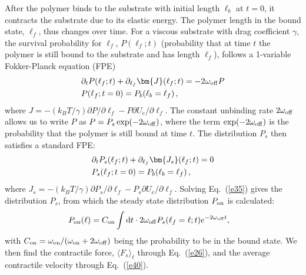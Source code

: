 \documentclass[twocolumn,prl,english]{revtex4-1}
\newcommand*\diff{\mathop{}\!\mathrm{d}}
\begin{document}
After the polymer binds to the substrate with initial length $\ell_b$ at $t=0$, it contracts the substrate due to its elastic energy.  The polymer length in the bound state, $\ell_f$, thus changes over time. For a viscous substrate with drag coefficient $\gamma$, the survival probability for $\ell_f$, $P(\ell_f;t)$ (probability that at time $t$ the polymer is still bound to the substrate and has length $\ell_f$), follows a 1-variable Fokker-Planck equation (FPE)
\begin{align}
&\partial_t {P}( \ell_f;t)+\partial_{\ell_f} {\bm {J}( \ell_f;t)}= - 2\omega_{\rm off}{P}\notag\\
& {P}( \ell_f;t=0)=P_b(\ell_b=\ell_f)\,,\label{e24}
\end{align}
where $J= -(k_B T/\gamma)\partial P/\partial \ell_f-{P}\partial U_e/\partial \ell_f $. The constant unbinding rate $2\omega_{\rm off}$ allows us to write $P$ as $P=P_s \exp(-2\omega_{\rm off})$, where the term $\exp(-2\omega_{\rm off})$ is the probability that the polymer is still bound at time $t$.  The distribution $P_s$ then satisfies a standard FPE:
\begin{align}
&\partial_t {P}_s( \ell_f;t)+\partial_{\ell_f} {\bm {J_s}( \ell_f;t)}= 0\notag\\
& {P_s}( \ell_f;t=0)=P_b(\ell_b=\ell_f)\,,\label{e35}
\end{align}
where $J_s= -(k_B T/\gamma)\partial{P_s}/\partial \ell_f-{P_s}\partial U_e/\partial \ell_f $.
Solving Eq.~(\ref{e35}) gives the distribution $P_s$, from which the steady state distribution $P_{\rm on}$ is calculated:
\begin{align}
&{P_{\rm on}}( \ell)=C_{\rm on}\int \diff t \cdot 2\omega_{\rm off} P_s(\ell_f=\ell;t)e^{-2\omega_{\rm off} t},\label{e25}
\end{align}
with $C_{\rm on} = \omega_{\rm on}/(\omega_{\rm on}+2\omega_{\rm off})$ being the probability to be in the bound state. We then find the contractile force, $\langle F_s\rangle_\ell$ through Eq.~(\ref{e26}), and the average contractile velocity through  Eq.~(\ref{e40}). 
\end{document}
